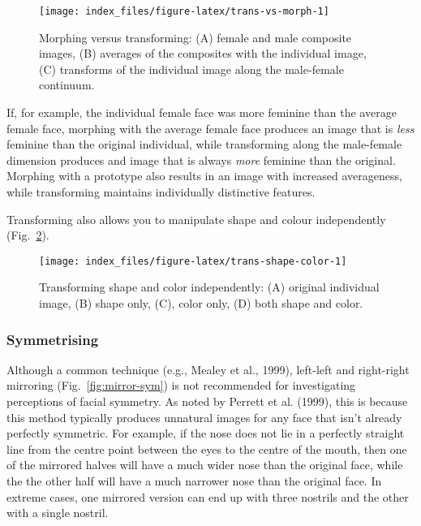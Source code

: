 \documentclass[
  doc,floatsintext]{apa6}
\begin{document}
\begin{figure}
\texttt{[image: index\_files/figure-latex/trans-vs-morph-1]} \caption{Morphing versus transforming: (A) female and male composite images, (B) averages of the composites with the individual image, (C) transforms of the individual image along the male-female continuum.}\label{fig:trans-vs-morph}
\end{figure}

If, for example, the individual female face was more feminine than the average female face, morphing with the average female face produces an image that is \emph{less} feminine than the original individual, while transforming along the male-female dimension produces and image that is always \emph{more} feminine than the original. Morphing with a prototype also results in an image with increased averageness, while transforming maintains individually distinctive features.

Transforming also allows you to manipulate shape and colour independently (Fig.~\ref{fig:trans-shape-color}).

\begin{figure}
\texttt{[image: index\_files/figure-latex/trans-shape-color-1]} \caption{Transforming shape and color independently: (A) original individual image, (B) shape only, (C), color only, (D) both shape and color.}\label{fig:trans-shape-color}
\end{figure}

\hypertarget{symmetrising}{%
\subsubsection{Symmetrising}\label{symmetrising}}

Although a common technique (e.g., Mealey et al., 1999), left-left and right-right mirroring (Fig.~\ref{fig:mirror-sym}) is not recommended for investigating perceptions of facial symmetry. As noted by Perrett et al. (1999), this is because this method typically produces unnatural images for any face that isn't already perfectly symmetric. For example, if the nose does not lie in a perfectly straight line from the centre point between the eyes to the centre of the mouth, then one of the mirrored halves will have a much wider nose than the original face, while the the other half will have a much narrower nose than the original face. In extreme cases, one mirrored version can end up with three nostrils and the other with a single nostril.
\end{document}
